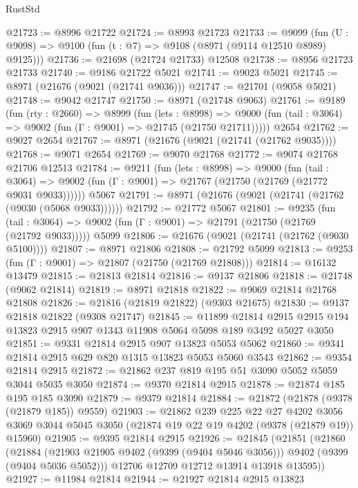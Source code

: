 \begin{lexlean}{RustStd}
\begin{coremodule}
@21723 := @8996 @21722
@21724 := @8993 @21723
@21733 := @9099
    (fun (U : @9098) => @9100 (fun (t : @7) => @9108 (@8971 (@9114 @12510 @8989) @9125)))
@21736 := @21698 (@21724 @21733) @12508
@21738 := @8956 @21723 @21733
@21740 := @9186 @21722 @5021
@21741 := @9023 @5021
@21745 := @8971 (@21676 (@9021 (@21741 @9036)))
@21747 := @21701 (@9058 @5021)
@21748 := @9042 @21747
@21750 := @8971 (@21748 @9063)
@21761 := @9189
    (fun (rty : @2660) =>
    @8999
      (fun (lets : @8998) =>
      @9000 (fun (tail : @3064) => @9002 (fun (Γ : @9001) => @21745 (@21750 @21711)))))
    @2654
@21762 := @9027 @2654
@21767 := @8971 (@21676 (@9021 (@21741 (@21762 @9035))))
@21768 := @9071 @2654
@21769 := @9070 @21768
@21772 := @9074 @21768 @21706 @12513
@21784 := @9211
    (fun (lets : @8998) =>
    @9000
      (fun (tail : @3064) =>
      @9002 (fun (Γ : @9001) => @21767 (@21750 (@21769 (@21772 @9031 @9033))))))
    @5067
@21791 := @8971 (@21676 (@9021 (@21741 (@21762 (@9030 (@5068 @9033))))))
@21792 := @21772 @5067
@21801 := @9235
    (fun (tail : @3064) => @9002 (fun (Γ : @9001) => @21791 (@21750 (@21769 (@21792 @9033)))))
    @5099
@21806 := @21676 (@9021 (@21741 (@21762 (@9030 @5100))))
@21807 := @8971 @21806
@21808 := @21792 @5099
@21813 := @9253 (fun (Γ : @9001) => @21807 (@21750 (@21769 @21808)))
@21814 := @16132 @13479
@21815 := @21813 @21814
@21816 := @9137 @21806
@21818 := @21748 (@9062 @21814)
@21819 := @8971 @21818
@21822 := @9069 @21814 @21768 @21808
@21826 := @21816 (@21819 @21822) (@9303 @21675)
@21830 := @9137 @21818 @21822 (@9308 @21747)
@21845 := @11899
    @21814
    @2915
    @2915
    @194
    @13823
    @2915
    @907
    @1343
    @11908
    @5064
    @5098
    @189
    @3492
    @5027
    @3050
@21851 := @9331 @21814 @2915 @907 @13823 @5053 @5062
@21860 := @9341 @21814 @2915 @629 @820 @1315 @13823 @5053 @5060 @3543
@21862 := @9354 @21814 @2915
@21872 := @21862 @237 @819 @195 @51 @3090 @5052 @5059 @3044 @5035 @3050
@21874 := @9370 @21814 @2915
@21878 := @21874 @185 @195 @185 @3090
@21879 := @9379 @21814
@21884 := @21872 (@21878 (@9378 (@21879 @185)) @9559)
@21903 := @21862
    @239
    @225
    @22
    @27
    @4202
    @3056
    @3069
    @3044
    @5045
    @3050
    (@21874 @19 @22 @19 @4202 (@9378 (@21879 @19)) @15960)
@21905 := @9395 @21814 @2915
@21926 := @21845
    (@21851
      (@21860
        (@21884 (@21903 @21905 @9402 (@9399 (@9404 @5046 @3056))) @9402 (@9399 (@9404 @5036 @5052)))
        @12706
        @12709
        @12712
        @13914
        @13918
        @13595))
@21927 := @11984 @21814
@21944 := @21927
    @21814
    @2915
    @13823

\end{coremodule}
\end{lexlean}
